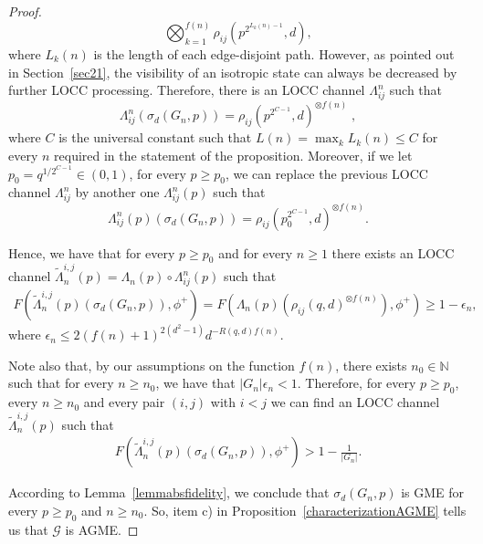 \documentclass[a4paper,onecolumn,accepted=2024-12-14]{quantumarticle}
\theoremstyle{plain}
\newcommand{\cG}{{\mathcal G}}         %
\begin{document}
\begin{proof}
\begin{equation}
    \bigotimes_{k=1}^{f(n)}\rho_{ij}\left(p^{2^{L_k(n)-1}},d\right),
\end{equation}
where $L_k(n)$ is the length of each edge-disjoint path. However, as pointed out in Section~\ref{sec21}, the visibility of an isotropic state can always be decreased by further LOCC processing. Therefore, there is an LOCC channel $\Lambda^n_{ij}$ such that
\begin{equation}
    \Lambda^n_{ij}(\sigma_d(G_n,p))=\rho_{ij}(p^{2^{C-1}},d)^{\otimes f(n)}\;,
\end{equation}
where $C$ is the universal constant such that $L(n)=\max_kL_k(n)\leq C$ for every $n$ required in the statement of the proposition. Moreover, if we let $p_0=q^{1/2^{C-1}}\in (0,1)$, for every $p\geq p_0$, we can replace the previous LOCC channel $\Lambda^n_{ij}$ by another one $\Lambda^n_{ij}(p)$ such that
\begin{equation}
    \Lambda^n_{ij}(p)(\sigma_d(G_n,p))=\rho_{ij}(p_0^{2^{C-1}},d)^{\otimes f(n)}.
\end{equation}

Hence, we have that for every $p\geq p_0$ and for every  $n\geq 1$ there exists an LOCC channel $\tilde{\Lambda}^{i,j}_n(p)=\Lambda_n(p)\circ \Lambda^n_{ij}(p)$ such that
\begin{align}
F\left(\tilde{\Lambda}^{i,j}_n(p)(\sigma_d(G_n,p)) ,\phi^+\right)=F\left(\Lambda_n(p)(\rho_{ij}(q,d)^{\otimes f(n)}) ,\phi^+\right)\geq 1-\epsilon_n,
\end{align}where $\epsilon_n\leq2(f(n)+1)^{2(d^2-1)}d^{-R(q,d)f(n)}$.


Note also that, by our assumptions on the function $f(n)$, there exists $n_0\in\mathbb N$ such that for every $n\geq n_0$, we have that $|G_n|\epsilon_n<1$. Therefore, for every $p\geq p_0$, every  $n\geq n_0$ and every pair $(i,j)$ with $i<j$ we can find an LOCC channel $\tilde{\Lambda}^{i,j}_n(p)$ such that
\begin{align}
F\left(\tilde{\Lambda}^{i,j}_n(p)(\sigma_d(G_n,p)) ,\phi^+\right)> 1-\frac{1}{|G_n|}.
\end{align}

According to Lemma~\ref{lemmabsfidelity}, we conclude that $\sigma_d(G_n,p)$ is GME for every $p\geq p_0$ and $n\geq n_0$. So, item c) in
Proposition~\ref{characterizationAGME} tells us that $\cG$ is AGME.
\end{proof}
\end{document}
